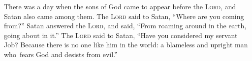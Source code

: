 
\begin{inparaenum}
    
     There was a day when the sons of God came to appear before the \textsc{Lord}, and Satan also came among them.%
     The \textsc{Lord} said to Satan, ``Where are you coming from?'' Satan answered the \textsc{Lord}, and said, ``From roaming around in the earth, going about in it.''%
     The \textsc{Lord} said to Satan, ``Have you considered my servant Job? Because there is no one like him in the world: a blameless and upright man who\understood\ fears God and desists from evil.''%
    
    
    \pvba{}%
    
    \pvba{}%
    
    
    \pvbb{}{}%
    
    \pvba{}%
    
    \pvba{}%
    
    
    \pvbb{}{}%
    
    
    \pvbb{}{}%
    
    \pvba{}%
    
    
    \pveb{}{}%
    \pveb{}{}%
    
\end{inparaenum}

